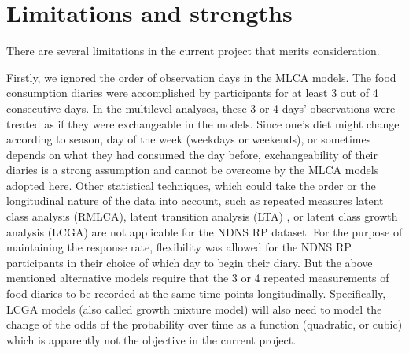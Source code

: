 










\section{Limitations and strengths}

There are several limitations in the current project that merits consideration.  

Firstly, we ignored the order of observation days in the MLCA models. The food consumption diaries were accomplished by participants for at least 3 out of 4 consecutive days. In the multilevel analyses, these 3 or 4 days' observations were treated as if they were exchangeable in the models. Since one's diet might change according to season, day of the week (weekdays or weekends), or sometimes depends on what they had consumed the day before, exchangeability of their diaries is a strong assumption and cannot be overcome by the MLCA models adopted here. Other statistical techniques, which could take the order or the longitudinal nature of the data into account, such as repeated measures latent class analysis (RMLCA), latent transition analysis (LTA) \parencite{collins2010latent}, or latent class growth analysis (LCGA) \parencite{davidian2008growth,jung2008introduction,andruff2009latent} are not applicable for the NDNS RP dataset. For the purpose of maintaining the response rate, flexibility was allowed for the NDNS RP participants in their choice of which day to begin their diary. But the above mentioned alternative models require that the 3 or 4 repeated measurements of food diaries to be recorded at the same time points longitudinally. Specifically, LCGA models (also called growth mixture model) will also need to model the change of the odds of the probability over time as a function (quadratic, or cubic) which is apparently not the objective in the current project. 

